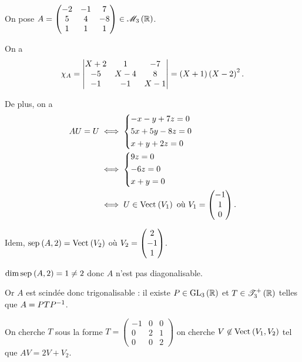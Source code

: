 \begin{corr}~\\
On pose \(A=\begin{pmatrix}
-2 & -1 & 7 \\
5 & 4 & -8 \\
1 & 1 & 1
\end{pmatrix}\in\M{3}[\R]\).

On a \[\chi_A=\begin{vmatrix}
X+2 & 1 & -7 \\
-5 & X-4 & 8 \\
-1 & -1 & X-1
\end{vmatrix}=\left(X+1\right)\left(X-2\right)^2.\]

De plus, on a \[\begin{aligned}
AU=U&\ssi\begin{dcases}
-x-y+7z=0 \\
5x+5y-8z=0 \\
x+y+2z=0
\end{dcases} \\
&\ssi\begin{dcases}
9z=0 \\
-6z=0 \\
x+y=0
\end{dcases} \\
&\ssi U\in\Vect{V_1}\text{ où }V_1=\tcoords{-1}{1}{0}.
\end{aligned}\]

Idem, \(\sep{A}{2}=\Vect{V_2}\) où \(V_2=\begin{pmatrix}2\\-1\\1\end{pmatrix}\).

\(\dim\sep{A}{2}=1\not=2\) donc \(A\) n'est pas diagonalisable.

Or \(A\) est scindée donc trigonalisable : il existe \(P\in\GL{3}[\R]\) et \(T\in\Tsup{3}[\R]\) telles que \(A=PTP^{-1}\).

On cherche \(T\) sous la forme \(T=\begin{pmatrix}
-1 & 0 & 0 \\
0 & 2 & 1 \\
0 & 0 & 2
\end{pmatrix}\) \ie on cherche \(V\not\in\Vect{V_1,V_2}\) tel que \(AV=2V+V_2\).


\end{corr}
